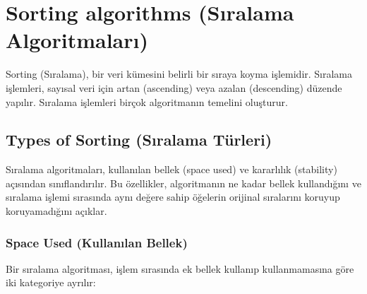 \section{Sorting algorithms (Sıralama Algoritmaları)}

Sorting (Sıralama), bir veri kümesini belirli bir sıraya koyma işlemidir. Sıralama işlemleri, sayısal veri için artan (ascending) veya azalan (descending) düzende yapılır. Sıralama işlemleri birçok algoritmanın temelini oluşturur.

\begin{table}[h]
\end{table}

\subsection{Types of Sorting (Sıralama Türleri)}

Sıralama algoritmaları, kullanılan bellek (space used) ve kararlılık (stability) açısından sınıflandırılır. Bu özellikler, algoritmanın ne kadar bellek kullandığını ve sıralama işlemi sırasında aynı değere sahip öğelerin orijinal sıralarını koruyup koruyamadığını açıklar.

\subsubsection{Space Used (Kullanılan Bellek)}

Bir sıralama algoritması, işlem sırasında ek bellek kullanıp kullanmamasına göre iki kategoriye ayrılır:

